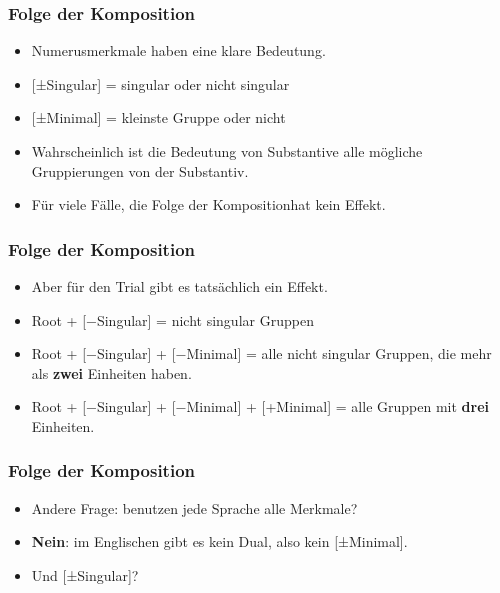 \documentclass{beamer}
\begin{document}
\begin{frame}
  \frametitle{Folge der Komposition}
  \begin{itemize}
    \item Numerusmerkmale haben eine klare Bedeutung.
    \item {[±Singular] = singular oder nicht singular}
    \item {[±Minimal] = kleinste Gruppe oder nicht}
    \item<2-> Wahrscheinlich ist die Bedeutung von Substantive alle mögliche Gruppierungen von der Substantiv.
    \item<3-> Für viele Fälle, die Folge der Kompositionhat kein Effekt.
  \end{itemize}
\end{frame}

\begin{frame}
  \frametitle{Folge der Komposition}
  \begin{itemize}
    \item Aber für den Trial gibt es tatsächlich ein Effekt.
    \item<2-> Root + [−Singular] = nicht singular Gruppen
    \item<3-> Root + [−Singular] + [−Minimal] = alle nicht singular Gruppen, die mehr als \textbf{zwei} Einheiten haben.
    \item<4-> Root + [−Singular] + [−Minimal] + [+Minimal] = alle Gruppen mit \textbf{drei} Einheiten.
  \end{itemize}
\end{frame}

\begin{frame}
  \frametitle{Folge der Komposition}
  \begin{itemize}
    \item Andere Frage: benutzen jede Sprache alle Merkmale?
    \item<2-> \textbf{Nein}: im Englischen gibt es kein Dual, also kein [±Minimal].
    \item<3-> Und [±Singular]?
  \end{itemize}
\end{frame}
\end{document}
